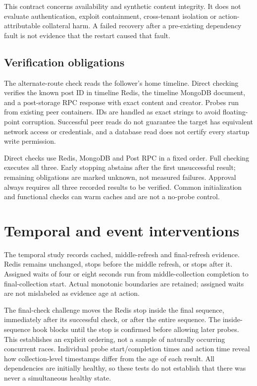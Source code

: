\documentclass[11pt]{article}
\begin{document}
This contract concerns availability and synthetic content integrity. It does not evaluate authentication, exploit containment, cross-tenant isolation or action-attributable collateral harm. A failed recovery after a pre-existing dependency fault is not evidence that the restart caused that fault.

\subsection{Verification obligations}
The alternate-route check reads the follower's home timeline. Direct checking verifies the known post ID in timeline Redis, the timeline MongoDB document, and a post-storage RPC response with exact content and creator. Probes run from existing peer containers. IDs are handled as exact strings to avoid floating-point corruption. Successful peer reads do not guarantee the target has equivalent network access or credentials, and a database read does not certify every startup write permission.

Direct checks use Redis, MongoDB and Post RPC in a fixed order. Full checking executes all three. Early stopping abstains after the first unsuccessful result; remaining obligations are marked unknown, not measured failures. Approval always requires all three recorded results to be verified. Common initialization and functional checks can warm caches and are not a no-probe control.

\section{Temporal and event interventions}
The temporal study records cached, middle-refresh and final-refresh evidence. Redis remains unchanged, stops before the middle refresh, or stops after it. Assigned waits of four or eight seconds run from middle-collection completion to final-collection start. Actual monotonic boundaries are retained; assigned waits are not mislabeled as evidence age at action.

The final-check challenge moves the Redis stop inside the final sequence, immediately after its successful check, or after the entire sequence. The inside-sequence hook blocks until the stop is confirmed before allowing later probes. This establishes an explicit ordering, not a sample of naturally occurring concurrent races. Individual probe start/completion times and action time reveal how collection-level timestamps differ from the age of each result. All dependencies are initially healthy, so these tests do not establish that there was never a simultaneous healthy state.
\end{document}
